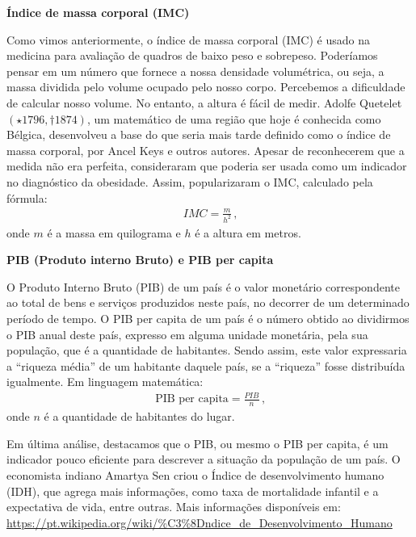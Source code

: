 \textbf{Índice de massa corporal (IMC)}

Como vimos anteriormente, o índice de massa corporal (IMC)  é usado na medicina para avaliação de quadros de baixo peso e sobrepeso.  Poderíamos pensar em um número que fornece a nossa densidade volumétrica, ou seja, a massa dividida pelo volume ocupado pelo nosso corpo. Percebemos a dificuldade de calcular nosso volume. No entanto, a altura é fácil de medir. Adolfe Quetelet \((\star 1796, \dagger 1874)\), um matemático de uma região que hoje é conhecida como Bélgica, desenvolveu a base do que seria mais tarde definido como o índice de massa corporal, por  Ancel Keys e outros autores. Apesar de reconhecerem que a medida não era perfeita, consideraram que poderia ser usada como um indicador no diagnóstico da obesidade. Assim, popularizaram o IMC, calculado pela fórmula:
\begin{equation*}
\begin{split}IMC=\frac{m}{h^2}\, \text{,}\end{split}
\end{equation*}
onde \(m\) é a massa em quilograma e \(h\) é a altura em metros.

\textbf{PIB (Produto interno Bruto) e PIB per capita}

O Produto Interno Bruto (PIB) de um país é o valor monetário correspondente ao total de bens e serviços produzidos neste país, no decorrer de um determinado período de tempo. O PIB per capita de um país é o número obtido ao dividirmos o PIB anual deste país, expresso em alguma unidade monetária, pela sua população, que é a quantidade de habitantes. Sendo assim, este valor expressaria a “riqueza média” de um habitante daquele país, se a “riqueza” fosse distribuída igualmente. Em linguagem matemática:
\begin{equation*}
\begin{split}\text{PIB per capita} = \frac{PIB}{n} \, \text{,}\end{split}
\end{equation*}
onde \(n\) é a quantidade de habitantes do lugar.

Em última análise, destacamos que o PIB, ou mesmo o PIB per capita, é um indicador pouco eficiente para descrever a situação da  população de um país. O economista indiano Amartya Sen criou o Índice de desenvolvimento humano (IDH), que agrega mais informações, como taxa de mortalidade infantil e a expectativa de vida, entre outras. Mais informações disponíveis em: \url{https://pt.wikipedia.org/wiki/\%C3\%8Dndice\_de\_Desenvolvimento\_Humano}

